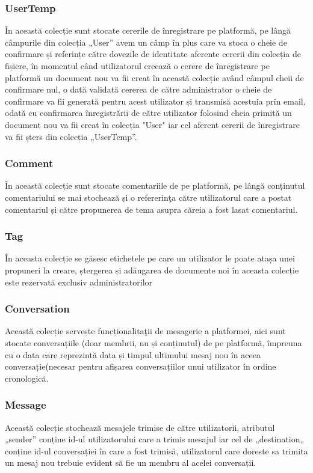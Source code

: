 \documentclass[12pt,a4paper,hidelinks]{report}
\theoremstyle{definition}
\theoremstyle{remark}
\begin{document}
\subsubsection{UserTemp}
În această colecție sunt stocate cererile de înregistrare pe platformă, pe lângă câmpurile din colecția „User” avem un câmp în plus care va stoca o cheie de confirmare și referințe către dovezile de identitate aferente cererii din colecția de fișiere, în momentul când utilizatorul creează o cerere de înregistrare pe platformă un document nou va fii creat în această colecție având câmpul cheii de confirmare nul, o dată validată cererea de către administrator o cheie de confirmare va fii generată pentru acest utilizator și transmisă acestuia prin email, odată cu confirmarea înregistrării de către utilizator folosind cheia primită un document nou va fii creat în colecția "User" iar cel aferent cererii de înregistrare va fii șters din colecția „UserTemp”.
\subsubsection{Comment}
În această colecție sunt stocate comentariile de pe platformă, pe lângă conținutul comentariului se mai stochează și o refererin\c ta către utilizatorul care a postat comentariul și către propunerea de tema asupra căreia a fost lasat comentariul.
\subsubsection{Tag}
În aceasta colecție se găsesc etichetele pe care un utilizator le poate atașa unei propuneri la creare, ștergerea și adăugarea de documente noi în aceasta colecție este rezervată exclusiv administratorilor
\subsubsection{Conversation}
Această colecție servește funcționalita\c tii de mesagerie a platformei, aici sunt stocate conversațiile (doar membrii, nu și conținutul) de pe platformă, împreuna cu o data care reprezintă data și timpul ultimului mesaj nou în aceea conversație(necesar pentru afișarea conversațiilor unui utilizator în ordine cronologică.
\subsubsection{Message}
Această colecție stochează mesajele trimise de către utilizatorii, atributul „sender” conține id-ul utilizatorului care a trimis mesajul iar cel de „destination„ conține id-ul conversației în care a fost trimisă, utilizatorul   care doreste sa trimita un mesaj nou trebuie evident să fie un membru al acelei conversații.
\end{document}
